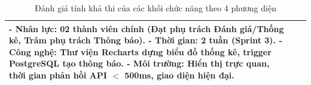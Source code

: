 \begin{table}[H]
\begin{tabularx}{\textwidth}{|p{3.2cm}|p{4.2cm}|X|}
- \textbf{Nhân lực:} 02 thành viên chính (Đạt phụ trách Đánh giá/Thống kê, Trâm phụ trách Thông báo).\newline
- \textbf{Thời gian:} 2 tuần (Sprint 3).\newline
- \textbf{Công nghệ:} Thư viện Recharts dựng biểu đồ thống kê, trigger PostgreSQL tạo thông báo.\newline
- \textbf{Môi trường:} Hiển thị trực quan, thời gian phản hồi API $<$ 500ms, giao diện hiện đại. \\
\hline
\end{tabularx}
\caption{Đánh giá tính khả thi của các khối chức năng theo 4 phương diện}
\label{tab:tinh_kha_thi}
\end{table}
